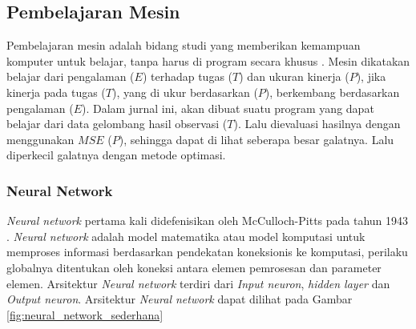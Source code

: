 \subsection{Pembelajaran Mesin}

Pembelajaran mesin adalah bidang studi yang memberikan kemampuan komputer untuk belajar, tanpa harus di program secara khusus \cite{arthur_l_samuel_1959}. Mesin dikatakan belajar dari pengalaman ($E$) terhadap tugas ($T$) dan ukuran kinerja ($P$), jika kinerja pada tugas ($T$), yang di ukur berdasarkan ($P$), berkembang berdasarkan pengalaman ($E$). Dalam jurnal ini, akan dibuat suatu program yang dapat belajar dari data gelombang hasil observasi ($T$). Lalu dievaluasi hasilnya dengan menggunakan $MSE$ ($P$), sehingga dapat di lihat seberapa besar galatnya. Lalu diperkecil galatnya dengan metode optimasi.



\subsubsection{Neural Network}

\emph{Neural network} pertama kali didefenisikan oleh McCulloch-Pitts pada tahun 1943 \cite{McCulloch1943}. \emph{Neural network} adalah model matematika atau model komputasi untuk memproses informasi berdasarkan pendekatan koneksionis ke komputasi, perilaku globalnya ditentukan oleh koneksi antara elemen pemrosesan dan parameter elemen\cite{gurney2014introduction}.
Arsitektur \emph{Neural network} terdiri dari \emph{Input neuron}, \emph{hidden layer} dan \emph{Output neuron}. Arsitektur \emph{Neural network} dapat dilihat pada Gambar 
\ref{fig:neural_network_sederhana}

